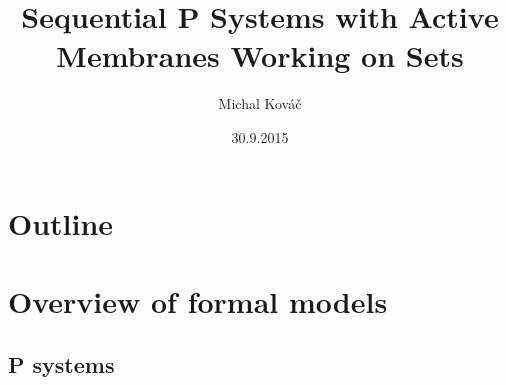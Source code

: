 \usepackage[utf8]{inputenc}
\usepackage{slovak}
\usepackage{tikz}
\usepackage{fancybox}
\usepackage{import}
\usepackage{forloop}
\usepackage{color,soul}
\usepackage{ifthen}
\makeatletter
\newcommand\SoulColor{%
  \let\set@color\beamerorig@set@color
  \let\reset@color\beamerorig@reset@color}
\newcommand\hlif[2]{%
  \ifthenelse{#1}{\SoulColor\hl{#2}}{#2}
}
\makeatother
\usepackage[english]{babel}
\usetikzlibrary{arrows,positioning}

\title{Sequential P Systems with Active Membranes Working on Sets}
\author{Michal Kováč}
\date{30.9.2015}


\begin{frame}[t]
\titlepage
\end{frame}
\note{}

\section*{Outline}
\begin{frame}
\tableofcontents
\end{frame}
\note{}

\section{Overview of formal models} %
\label{sec:overview_of_formal_models}

  \subsection{P systems} %
  \label{sub:p_systems}

